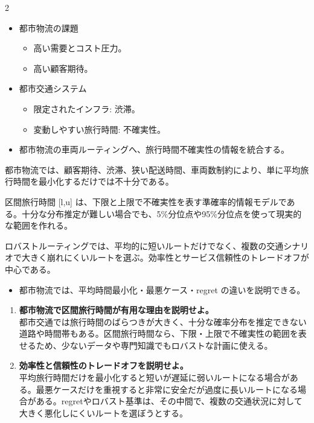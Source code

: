 \clearpage
{}
\begin{multicols}{2}\footnotesize\raggedcolumns
{}
\begin{itemize}
\item 都市物流の課題
\begin{itemize}
\item 高い需要とコスト圧力。
\item 高い顧客期待。
\end{itemize}
\item 都市交通システム
\begin{itemize}
\item 限定されたインフラ: 渋滞。
\item 変動しやすい旅行時間: 不確実性。
\end{itemize}
\item 都市物流の車両ルーティングへ、旅行時間不確実性の情報を統合する。
\end{itemize}
都市物流では、顧客期待、渋滞、狭い配送時間、車両数制約により、単に平均旅行時間を最小化するだけでは不十分である。\par

区間旅行時間 [l,u] は、下限と上限で不確実性を表す準確率的情報モデルである。十分な分布推定が難しい場合でも、5\%分位点や95\%分位点を使って現実的な範囲を作れる。\par

ロバストルーティングでは、平均的に短いルートだけでなく、複数の交通シナリオで大きく崩れにくいルートを選ぶ。効率性とサービス信頼性のトレードオフが中心である。\par
{}
\begin{itemize}
\item 都市物流では、平均時間最小化・最悪ケース・regret の違いを説明できる。
\end{itemize}
\begin{enumerate}
\item \textbf{都市物流で区間旅行時間が有用な理由を説明せよ。}\\都市交通では旅行時間のばらつきが大きく、十分な確率分布を推定できない道路や時間帯もある。区間旅行時間なら、下限・上限で不確実性の範囲を表せるため、少ないデータや専門知識でもロバストな計画に使える。
\item \textbf{効率性と信頼性のトレードオフを説明せよ。}\\平均旅行時間だけを最小化すると短いが遅延に弱いルートになる場合がある。最悪ケースだけを重視すると非常に安全だが過度に長いルートになる場合がある。regretやロバスト基準は、その中間で、複数の交通状況に対して大きく悪化しにくいルートを選ぼうとする。
\end{enumerate}
\end{multicols}

